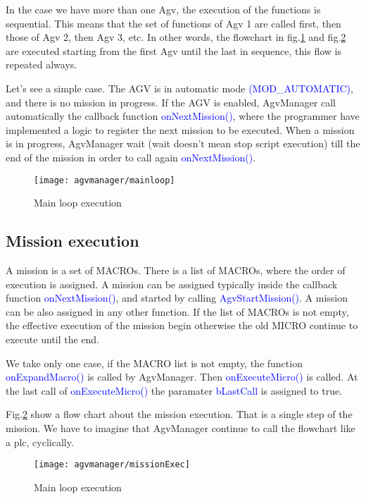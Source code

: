 In the case we have more than one Agv, the execution of the functions is sequential. This means that the set of functions of Agv 1 are called first, then those of Agv 2, then Agv 3, etc. In other words, the flowchart in fig.\ref{fig:mainLoop} and fig.\ref{fig:missionExec} are executed starting from the first Agv until the last in sequence, this flow is repeated always.

Let's see a simple case. The AGV is in automatic mode \textcolor{blue}{(MOD\_AUTOMATIC)}, and there is no mission in progress. If the AGV is enabled, AgvManager call automatically the callback function \textcolor{blue}{onNextMission()}, where the programmer have implemented a logic to register the next mission to be executed. When a mission is in progress, AgvManager wait (wait doesn't mean stop script execution) till the end of the mission in order to call again \textcolor{blue}{onNextMission()}.

\begin{figure}
	\centering\texttt{[image: agvmanager/mainloop]}
	\caption{Main loop execution}
	\label{fig:mainLoop}
\end{figure}

\subsection{Mission execution}
A mission is a set of MACROs. There is a list of MACROs, where the order of execution is assigned.
A mission can be assigned typically inside the callback function \textcolor{blue}{onNextMission()}, and started by calling \textcolor{blue}{AgvStartMission()}. A mission can be also assigned in any other function.
If the list of MACROs is not empty, the effective execution of the mission begin otherwise the old MICRO continue to execute until the end.

We take only one case, if the MACRO list is not empty, the function \textcolor{blue}{onExpandMacro()} is called by AgvManager.
Then \textcolor{blue}{onExecuteMicro()} is called. At the last call of \textcolor{blue}{onExecuteMicro()} the paramater \textcolor{blue}{bLastCall} is assigned to true.

Fig.\ref{fig:missionExec} show a flow chart about the mission execution.
That is a single step of the mission. We have to imagine that AgvManager continue to call the flowchart like a plc, cyclically.

\begin{figure}
	\centering\texttt{[image: agvmanager/missionExec]}
	\caption{Main loop execution}
	\label{fig:missionExec}
\end{figure}

